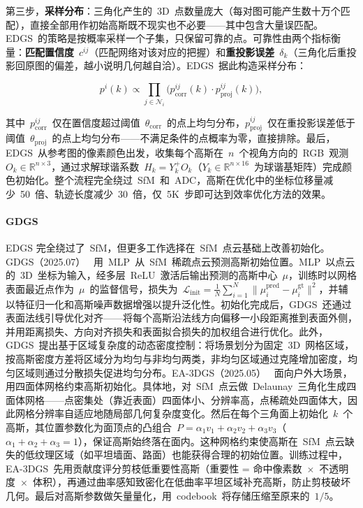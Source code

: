第三步，\textbf{采样分布}：三角化产生的~3D~点数量庞大（每对图可能产生数十万个匹配），直接全部用作初始高斯既不现实也不必要——其中包含大量误匹配。EDGS~的策略是按概率采样一个子集，只保留可靠的点。可靠性由两个指标衡量：\textbf{匹配置信度}~$c^{ij}$（匹配网络对该对应的把握）和\textbf{重投影误差}~$\delta_k$（三角化后重投影回原图的偏差，越小说明几何越自洽）。EDGS~据此构造采样分布：

\begin{equation*}
p^i(k) \propto \prod_{j \in \mathcal{N}_i} \bigl(p_{\text{corr}}^{ij}(k) \cdot p_{\text{proj}}^{ij}(k)\bigr),
\end{equation*}

其中~$p_{\text{corr}}^{ij}$~仅在置信度超过阈值~$\theta_{\text{corr}}$~的点上均匀分布，$p_{\text{proj}}^{ij}$~仅在重投影误差低于阈值~$\theta_{\text{proj}}$~的点上均匀分布——不满足条件的点概率为零，直接排除。最后，EDGS~从参考图的像素颜色出发，收集每个高斯在~$n$~个视角方向的~RGB~观测~$O_k \in \mathbb{R}^{n \times 3}$，通过求解球谐系数~$H_k = Y_k^{+}O_k$（$Y_k \in \mathbb{R}^{n \times 16}$~为球谐基矩阵）完成颜色初始化。整个流程完全绕过~SfM~和~ADC，高斯在优化中的坐标位移量减少~50~倍、轨迹长度减少~30~倍，仅~5K~步即可达到效率优化方法的效果。

\paragraph{GDGS}
EDGS 完全绕过了~SfM，但更多工作选择在~SfM~点云基础上改善初始化。GDGS（2025.07）~\cite{2507_00363} 用~MLP~从~SfM~稀疏点云预测高斯初始位置。MLP~以点云的~3D~坐标为输入，经多层~ReLU~激活后输出预测的高斯中心~$\mu$，训练时以网格表面最近点作为~$\mu$~的监督信号，损失为~$\mathcal{L}_{\text{init}} = \frac{1}{N}\sum_{i=1}^{N}\|\mu_i^{\text{pred}} - \mu_i^{\text{gt}}\|^2$，并辅以特征归一化和高斯噪声数据增强以提升泛化性。初始化完成后，GDGS~还通过表面法线引导优化对齐——将每个高斯沿法线方向偏移一小段距离推到表面外侧，并用距离损失、方向对齐损失和表面拟合损失的加权组合进行优化。此外，GDGS~提出基于区域复杂度的动态密度控制：将场景划分为固定~3D~网格区域，按高斯密度方差将区域分为均匀与非均匀两类，非均匀区域通过克隆增加密度，均匀区域则通过分散损失促进均匀分布。EA-3DGS（2025.05）~\cite{2505_10787} 面向户外大场景，用四面体网格约束高斯初始化。具体地，对~SfM~点云做~Delaunay~三角化生成四面体网格——点密集处（靠近表面）四面体小、分辨率高，点稀疏处四面体大，因此网格分辨率自适应地随局部几何复杂度变化。然后在每个三角面上初始化~$k$~个高斯，其位置参数化为面顶点的凸组合~$P = \alpha_1 v_1 + \alpha_2 v_2 + \alpha_3 v_3$（$\alpha_1+\alpha_2+\alpha_3=1$），保证高斯始终落在面内。这种网格约束使高斯在~SfM~点云缺失的低纹理区域（如平坦墙面、路面）也能获得合理的初始位置。训练过程中，EA-3DGS~先用贡献度评分剪枝低重要性高斯（重要性 = 命中像素数~$\times$~不透明度~$\times$~体积），再通过曲率感知致密化在低曲率平坦区域补充高斯，防止剪枝破坏几何。最后对高斯参数做矢量量化，用~codebook~将存储压缩至原来的~$1/5$。

